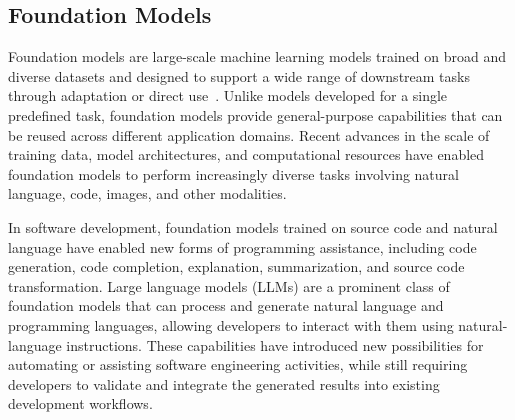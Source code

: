 
\subsection{Foundation Models}
\label{subsec:foundation-models}

Foundation models are large-scale machine learning models trained on broad and diverse datasets and designed to support a wide range of downstream tasks through adaptation or direct use~\cite{DBLP:journals/corr/abs-2108-07258}. Unlike models developed for a single predefined task, foundation models provide general-purpose capabilities that can be reused across different application domains. Recent advances in the scale of training data, model architectures, and computational resources have enabled foundation models to perform increasingly diverse tasks involving natural language, code, images, and other modalities.

In software development, foundation models trained on source code and natural language have enabled new forms of programming assistance, including code generation, code completion, explanation, summarization, and source code transformation. Large language models (LLMs) are a prominent class of foundation models that can process and generate natural language and programming languages, allowing developers to interact with them using natural-language instructions. These capabilities have introduced new possibilities for automating or assisting software engineering activities, while still requiring developers to validate and integrate the generated results into existing development workflows.

